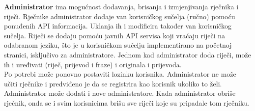 		\indent \textbf{Administrator} ima mogućnost dodavanja, brisanja i izmjenjivanja rječnika i riječi. Rječnike administrator dodaje van korisničkog sučelja (ručno) pomoću ponuđenih API informacija. Uklanja ih i modificira također van korisničkog sučelja. Riječi se dodaju pomoću javnih API servisa koji vraćaju riječi na odabranom jeziku, što je u korisničkom sučelju implementirano na početnoj stranici, isključivo za administratore. Jednom kad administrator doda riječi, može ih i uređivati (riječ, prijevod i fraze) i originala i prijevoda.
		\\

		\noindent Po potrebi može ponovno postaviti lozinku korisnika. Administrator ne može učiti rječnike i predviđeno je da se registrira kao korisnik ukoliko to želi. Administrator može dodati i nove administratore. Kada administrator obriše rječnik, onda se i svim korisnicima brišu sve riječi koje su pripadale tom rječniku.
		\\
		\\

		\eject
		
	